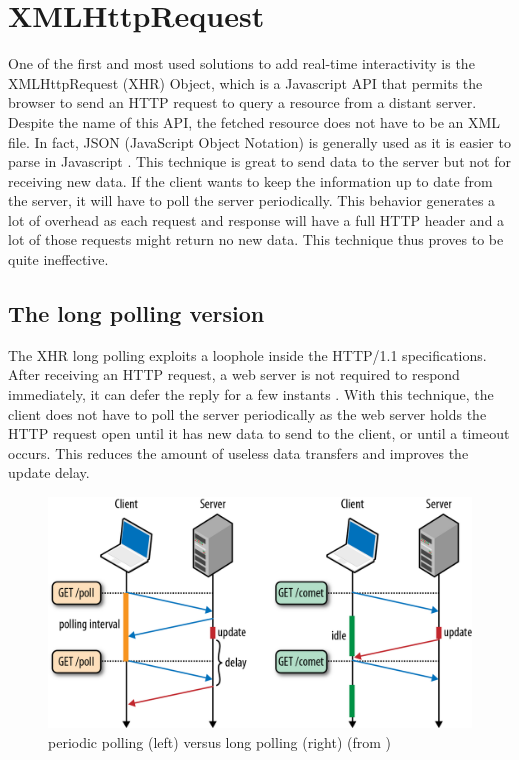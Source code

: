 \documentclass[10pt,journal,compsoc]{IEEEtran}
\begin{document}
\section{XMLHttpRequest}
\label{XHR}
One of the first and most used solutions to add real-time interactivity is the XMLHttpRequest (XHR) Object, which is a Javascript API that permits the browser to send an HTTP request to query a resource from a distant server. %
Despite the name of this API, the fetched resource does not have to be an XML file. %
In fact, JSON (JavaScript Object Notation) is generally used as it is easier to parse in Javascript \cite{collinalatency}.
This technique is great to send data to the server but not for receiving new data.
If the client wants to keep the information up to date from the server, it will have to poll the server periodically.
This behavior generates a lot of overhead as each request and response will have a full HTTP header and a lot of those requests might return no new data. This technique thus proves to be quite ineffective. %

\subsection{The long polling version}

The XHR long polling exploits a loophole inside the \mbox{HTTP/1.1} specifications.
After receiving an HTTP request, a web server is not required to respond immediately, it can defer the reply for a few instants \cite{collinalatency}.
With this technique, the client does not have to poll the server periodically as the web server holds the HTTP request open until it has new data to send to the client, or until a timeout occurs.
This reduces the amount of useless data transfers and improves the update delay.

\begin{figure}[!ht]
  \centering
  \includegraphics[width=\linewidth]{poll_vs_lpoll}
  \caption{periodic polling (left) versus long polling (right) (from \cite{HighPerfBrowserNetworking:polling})}
  \label{poll_vs_lpoll}
\end{figure}
\end{document}

